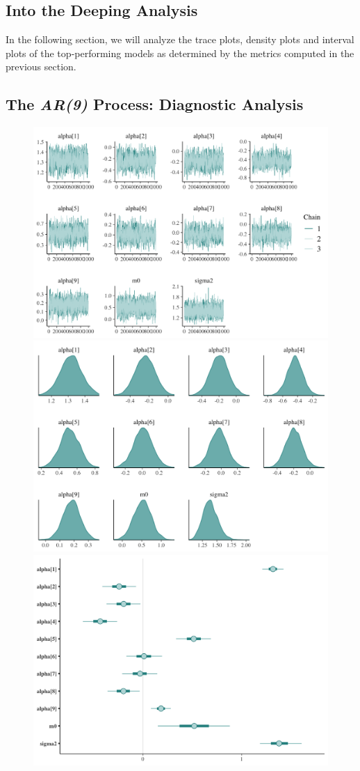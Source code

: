 \documentclass{Configuration_Files/PoliMi3i_thesis}
\begin{document}
\newpage
\subsection{Into the Deeping Analysis}
In the following section, we will analyze the trace plots, density plots and interval plots of the top‐performing models as determined by the metrics computed in the previous section.
\subsection{The \textbf{\textit{AR(9)}} Process: Diagnostic Analysis}
\begin{figure}[H]
    \centering
    \includegraphics[width=0.47\linewidth]{AR(9)_trace.png}
    \vspace{0.5em}
    
    \includegraphics[width=0.47\linewidth]{AR(9)_Density.png}
    \vspace{0.5em}
    
    \includegraphics[width=0.47\linewidth]{AR(9)_interval.png}
\end{figure}
\end{document}
